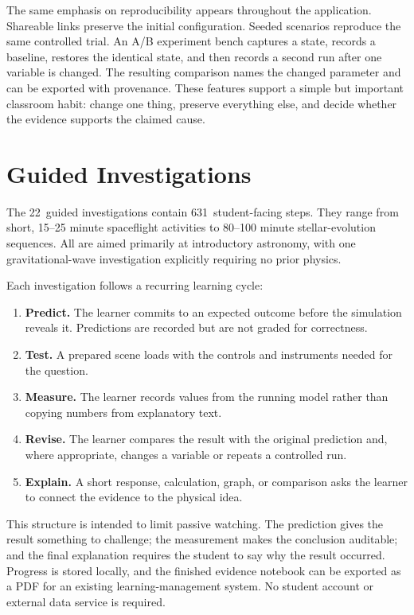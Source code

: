 \documentclass[twocolumn]{aastex631}
\newcommand{\InvestigationCount}{22}
\newcommand{\InvestigationSteps}{631}
\begin{document}
The same emphasis on reproducibility appears throughout the application.
Shareable links preserve the initial configuration. Seeded scenarios reproduce
the same controlled trial. An A/B experiment bench captures a state, records a
baseline, restores the identical state, and then records a second run after one
variable is changed. The resulting comparison names the changed parameter and
can be exported with provenance. These features support a simple but important
classroom habit: change one thing, preserve everything else, and decide whether
the evidence supports the claimed cause.

\section{Guided Investigations}
\label{sec:investigations}

The \InvestigationCount\ guided investigations contain
\InvestigationSteps\ student-facing steps. They range from short,
15--25 minute spaceflight activities to 80--100 minute stellar-evolution
sequences. All are aimed primarily at introductory astronomy, with one
gravitational-wave investigation explicitly requiring no prior physics.

Each investigation follows a recurring learning cycle:

\begin{enumerate}
\item \textbf{Predict.} The learner commits to an expected outcome before the
simulation reveals it. Predictions are recorded but are not graded for
correctness.
\item \textbf{Test.} A prepared scene loads with the controls and instruments
needed for the question.
\item \textbf{Measure.} The learner records values from the running model rather
than copying numbers from explanatory text.
\item \textbf{Revise.} The learner compares the result with the original
prediction and, where appropriate, changes a variable or repeats a controlled
run.
\item \textbf{Explain.} A short response, calculation, graph, or comparison asks
the learner to connect the evidence to the physical idea.
\end{enumerate}

This structure is intended to limit passive watching. The prediction gives the
result something to challenge; the measurement makes the conclusion auditable;
and the final explanation requires the student to say why the result occurred.
Progress is stored locally, and the finished evidence notebook can be exported
as a PDF for an existing learning-management system. No student account or
external data service is required.
\end{document}
